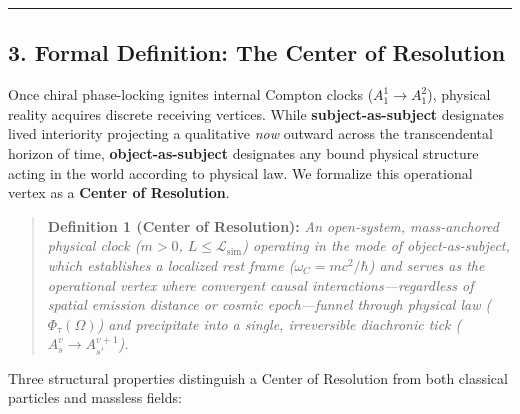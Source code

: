 \documentclass[
]{article}
\begin{document}
\begin{center}\rule{0.5\linewidth}{0.5pt}\end{center}

\subsection{3. Formal Definition: The Center of
Resolution}\label{formal-definition-the-center-of-resolution}

Once chiral phase-locking ignites internal Compton clocks
(\(A_1^1 \to A_1^2\)), physical reality acquires discrete receiving
vertices. While \textbf{subject-as-subject} designates lived interiority
projecting a qualitative \emph{now} outward across the transcendental
horizon of time, \textbf{object-as-subject} designates any bound
physical structure acting in the world according to physical law. We
formalize this operational vertex as a \textbf{Center of Resolution}.

\begin{quote}
\textbf{Definition 1 (Center of Resolution):} \emph{An open-system,
mass-anchored physical clock (\(m > 0\),
\(L \le \mathcal{L}_{\mathrm{sim}}\)) operating in the mode of
object-as-subject, which establishes a localized rest frame
(\(\omega_C = mc^2/\hbar\)) and serves as the operational vertex where
convergent causal interactions---regardless of spatial emission distance
or cosmic epoch---funnel through physical law (\(\Phi_\tau(\Omega)\))
and precipitate into a single, irreversible diachronic tick
(\(A_s^v \to A_{s'}^{v+1}\)).}
\end{quote}

Three structural properties distinguish a Center of Resolution from both
classical particles and massless fields:
\end{document}

